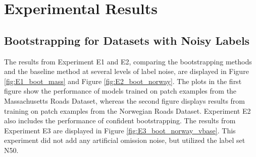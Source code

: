 \section{Experimental Results}
\label{sec:experimentalResults}
\subsection{Bootstrapping for Datasets with Noisy Labels}
\label{sec:results_bootstrapping}
The results from Experiment E1 and E2, comparing the bootstrapping methods and the baseline method at several levels of label noise, are displayed in Figure \ref{fig:E1_boot_mass} and Figure \ref{fig:E2_boot_norway}. The plots in the first figure show the performance of models trained on patch examples from the Massachusetts Roads Dataset, whereas the second figure displays results from training on patch examples from the Norwegian Roads Dataset. Experiment E2 also includes the performance of confident bootstrapping. The results from Experiment E3 are displayed in Figure \ref{fig:E3_boot_norway_vbase}. This experiment did not add any artificial omission noise, but utilized the label set N50.\\

